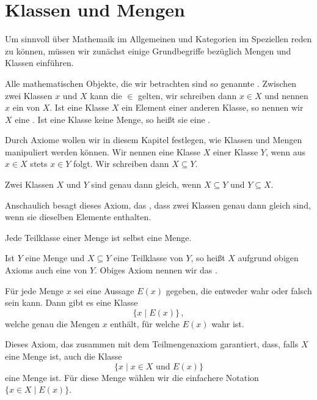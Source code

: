\section{Klassen und Mengen}
Um sinnvoll über Mathemaik im Allgemeinen und Kategorien im Speziellen reden zu können, müssen wir zunächst einige Grundbegriffe bezüglich Mengen und Klassen einführen.

Alle mathematischen Objekte, die wir betrachten sind so genannte . Zwischen zwei Klassen $x$ und $X$ kann die  $\in$ gelten, wir schreiben dann $x\in X$ und nennen $x$ ein  von $X$. Ist eine Klasse $X$ ein Element einer anderen Klasse, so nennen wir $X$ eine . Ist eine Klasse keine Menge, so heißt sie eine .

Durch Axiome wollen wir in diesem Kapitel festlegen, wie Klassen und Mengen manipuliert werden können. Wir nennen eine Klasse $X$  einer Klasse $Y$, wenn aus $x\in X$ stets $x\in Y$ folgt. Wir schreiben dann $X\subseteq Y$.

\begin{axiom}
Zwei Klassen $X$ und $Y$ sind genau dann gleich, wenn $X\subseteq Y$ und $Y\subseteq X$.
\end{axiom}

Anschaulich besagt dieses Axiom, das , dass zwei Klassen genau dann gleich sind, wenn sie dieselben Elemente enthalten.

\begin{axiom}
Jede Teilklasse einer Menge ist selbst eine Menge.
\end{axiom}

Ist $Y$ eine Menge und $X\subseteq Y$ eine Teilklasse von $Y$, so heißt $X$ aufgrund obigen Axioms auch eine  von $Y$. Obiges Axiom nennen wir das .

\begin{axiom}
Für jede Menge $x$ sei eine Aussage $E(x)$ gegeben, die entweder wahr oder falsch sein kann. Dann gibt es eine Klasse
\[
\{x\mid E(x)\}\,,
\]
welche genau die Mengen $x$ enthält, für welche $E(x)$ wahr ist.
\end{axiom}

Dieses Axiom, das  zusammen mit dem Teilmengenaxiom garantiert, dass, falls $X$ eine Menge ist, auch die Klasse
\[
\{x\mid x\in X\text{ und }E(x)\}
\]
eine Menge ist. Für diese Menge wählen wir die einfachere Notation $\{x\in X\mid E(x)\}$.

